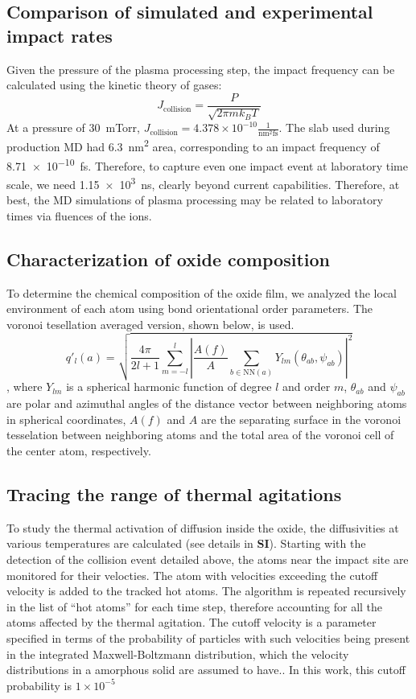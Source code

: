 \documentclass[manuscript=cmatex]{achemso}
\begin{document}
\subsection{Comparison of simulated and experimental impact rates}
Given the pressure of the plasma processing step, the impact frequency can be calculated using the kinetic theory of gases:
\begin{equation*}
  J_{\mathrm{collision}} = \frac{P}{\sqrt{2\pi m k_BT}}
\end{equation*}
At a pressure of \SI{30}{mTorr}, $J_{\mathrm{collision}}=4.378\times 10^{-10} \mathrm{\frac{1}{nm^2 fs}}$. The slab used during production MD had \SI{6.3}{nm^2} area, corresponding to an impact frequency of \SI{8.71e-10}{fs}. Therefore, to capture even one impact event at laboratory time scale, we need \SI{1.15e3}{ns}, clearly beyond current capabilities. Therefore, at best, the MD simulations of plasma processing may be related to laboratory times via fluences of the ions.
\subsection{Characterization of oxide composition}
To determine the chemical composition of the oxide film, we analyzed the local environment of each atom using bond orientational order parameters.\cite{steinhardt_bond-orientational_1983} The voronoi tesellation averaged version, shown below, is used.\cite{mickel_shortcomings_2013}
\begin{equation*}
  q'_l(a) = \sqrt{\frac{4\pi}{2l+1}\sum_{m=-l}^{l}|\frac{A(f)}{A}\sum_{b\in \mathrm{NN}(a)}Y_{lm}(\theta_{ab}, \psi_{ab})|^2}
\end{equation*}
, where $Y_{lm}$ is a spherical harmonic function of degree $l$ and order $m$, $\theta_{ab}$ and $\psi_{ab}$ are polar and azimuthal angles of the distance vector between neighboring atoms in spherical coordinates, $A(f)$ and $A$ are the separating surface in the voronoi tesselation between neighboring atoms and the total area of the voronoi cell of the center atom, respectively. 
\subsection{Tracing the range of thermal agitations}
To study the thermal activation of diffusion inside the oxide, the diffusivities at various temperatures are calculated (see details in \textbf{SI}). Starting with the detection of the collision event detailed above, the atoms near the impact site are monitored for their velocties. The atom with velocities exceeding the cutoff velocity is added to the tracked hot atoms. The algorithm is repeated recursively in the list of ``hot atoms'' for each time step, therefore accounting for all the atoms affected by the thermal agitation. The cutoff velocity is a parameter specified in terms of the probability of particles with such velocities being present in the integrated Maxwell-Boltzmann distribution, which the velocity distributions in a amorphous solid are assumed to have.\cite{mohazzabi_maxwell-boltzmann_2018}. In this work, this cutoff probability is $1\times 10^{-5}$
\end{document}
